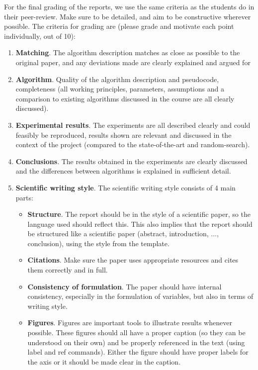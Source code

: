 \documentclass[runningheads]{llncs}
\begin{document}
For the final grading of the reports, we use the same criteria as the students do in their peer-review. Make sure to be detailed, and aim to be constructive wherever possible. The criteria for grading are (please grade and motivate each point individually, out of 10):

\begin{enumerate}
    \item \textbf{Matching}. The algorithm description matches as close as possible to the original paper, and any deviations made are clearly explained and argued for
    \item \textbf{Algorithm}. Quality of the algorithm description and pseudocode, completeness (all working principles, parameters, assumptions and a comparison to existing algorithms discussed in the course are all clearly discussed).
    \item \textbf{Experimental results}. The experiments are all described clearly and could feasibly be reproduced, results shown are relevant and discussed in the context of the project (compared to the state-of-the-art and random-search).
    \item \textbf{Conclusions}. The results obtained in the experiments are clearly discussed and the differences between algorithms is explained in sufficient detail.	
    \item \textbf{Scientific writing style}. The scientific writing style consists of 4 main parts: 
    \begin{itemize}
        \item \textbf{Structure}. The report should be in the style of a scientific paper, so the language used should reflect this. This also implies that the report should be structured like a scientific paper (abstract, introduction, ..., conclusion), using the style from the template.
        \item \textbf{Citations}. Make sure the paper uses appropriate resources and cites them correctly and in full.
        \item \textbf{Consistency of formulation}. The paper should have internal consistency, especially in the formulation of variables, but also in terms of writing style.
        \item \textbf{Figures}. Figures are important tools to illustrate results whenever possible. These figures should all have a proper caption (so they can be understood on their own) and be properly referenced in the text (using label and ref commands). Either the figure should have proper labels for the axis or it should be made clear in the caption.

\end{itemize}
\end{enumerate}
\end{document}
